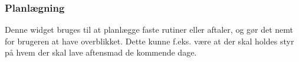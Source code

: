\newpage
\subsubsection{Planlægning}
Denne widget bruges til at planlægge faste rutiner eller aftaler, og gør det nemt for brugeren at have overblikket. Dette kunne f.eks. være at der skal holdes styr på hvem der skal lave aftensmad de kommende dage. \\







